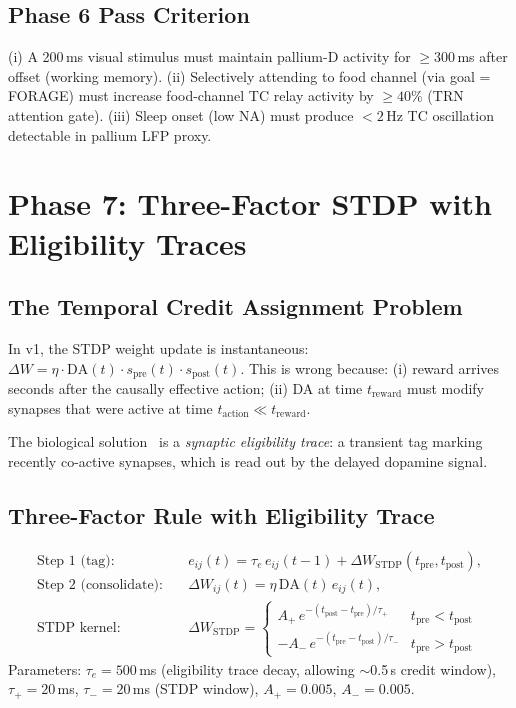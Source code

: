 \documentclass[11pt,a4paper]{article}
\begin{document}
\subsection{Phase 6 Pass Criterion}

(i) A 200\,ms visual stimulus must maintain pallium-D activity for
$\geq 300$\,ms after offset (working memory).
(ii) Selectively attending to food channel (via goal = FORAGE) must increase
food-channel TC relay activity by $\geq 40\%$ (TRN attention gate).
(iii) Sleep onset (low NA) must produce $<2$\,Hz TC oscillation detectable
in pallium LFP proxy.

\section{Phase 7: Three-Factor STDP with Eligibility Traces}\label{sec:phase7}

\subsection{The Temporal Credit Assignment Problem}

In v1, the STDP weight update is instantaneous:
$\Delta W = \eta \cdot \text{DA}(t) \cdot s_\text{pre}(t) \cdot s_\text{post}(t)$.
This is wrong because: (i) reward arrives seconds after the causally effective
action; (ii) DA at time $t_\text{reward}$ must modify synapses that were active
at time $t_\text{action} \ll t_\text{reward}$.

The biological solution~\cite{fremaux2016} is a \emph{synaptic eligibility trace}:
a transient tag marking recently co-active synapses, which is read out
by the delayed dopamine signal.

\subsection{Three-Factor Rule with Eligibility Trace}

\begin{equation}\label{eq:three_factor}
\boxed{
\begin{aligned}
  \text{Step 1 (tag):}\quad &
  e_{ij}(t) = \tau_e\,e_{ij}(t{-}1) + \Delta W_\text{STDP}(t_\text{pre}, t_\text{post}), \\
  \text{Step 2 (consolidate):}\quad &
  \Delta W_{ij}(t) = \eta\,\text{DA}(t)\,e_{ij}(t), \\
  \text{STDP kernel:}\quad &
  \Delta W_\text{STDP} = \begin{cases}
    A_+\,e^{-(t_\text{post}-t_\text{pre})/\tau_+} & t_\text{pre} < t_\text{post} \\
    -A_-\,e^{-(t_\text{pre}-t_\text{post})/\tau_-} & t_\text{pre} > t_\text{post}
  \end{cases}
\end{aligned}
}
\end{equation}
Parameters: $\tau_e = 500$\,ms (eligibility trace decay, allowing $\sim$0.5\,s
credit window), $\tau_+ = 20$\,ms, $\tau_- = 20$\,ms (STDP window),
$A_+ = 0.005$, $A_- = 0.005$.
\end{document}
